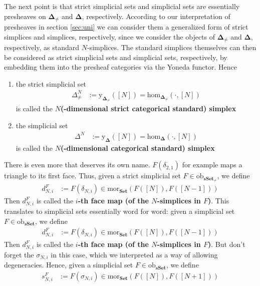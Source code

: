 The next point is that strict simplicial sets and simplicial sets are essentially presheaves on $\mathbf{\Delta}_{\neq}$ and $\mathbf{\Delta}$, respectively.
According to our interpretation of presheaves in section \ref{sec:uni} we can consider them a generalized form of strict simplices and simplices, respectively, since we consider the objects of $\mathbf{\Delta}_{\neq}$ and $\mathbf{\Delta}$, respectively, as standard $N$-simplices.
The standard simplices themselves can then be considered as strict simplicial sets and simplicial sets, respectively, by embedding them into the presheaf categories via the Yoneda functor.
Hence
\begin{enumerate}
\item[(1)]
the strict simplicial set
\begin{align*}
  \Delta_{\neq}^{N}
  &:=
  \mathrm{y}_{\mathbf{\Delta}_{\neq}}([N])
  =
  \mathrm{hom}_{\mathbf{\Delta}_{\neq}}(\cdot,[N])
\end{align*}
is called the \textbf{$N$(-dimensional strict categorical standard) simplex}
\item[(2)]
the simplicial set
\begin{align*}
  \Delta^{N}
  &:=
  \mathrm{y}_{\mathbf{\Delta}}([N])
  =
  \mathrm{hom}_{\mathbf{\Delta}}(\cdot,[N])
\end{align*}
is called the \textbf{$N$(-dimensional categorical standard) simplex}
\end{enumerate}
There is even more that deserves its own name.
$F(\delta_{2,1})$ for example maps a triangle to its first face.
Thus, given a strict simplicial set $F \in \mathrm{ob}_{\mathbf{sSet}_{\neq}}$, we define
\begin{align*}
  d_{N,i}^{F}
  &:=
  F(\delta_{N,i})
  \in
  \mathrm{mor}_{\mathbf{Set}}(F([N]),F([N-1]))
\end{align*}  
Then $d_{N,i}^{F}$ is called the \textbf{$i$-th face map (of the $N$-simplices in $F$)}.
This translates to simplicial sets essentially word for word: given a simplicial set $F \in \mathrm{ob}_{\mathbf{sSet}}$, we define
\begin{align*}
  d_{N,i}^{F}
  &:=
  F(\delta_{N,i})
  \in
  \mathrm{mor}_{\mathbf{Set}}(F([N]),F([N-1]))
\end{align*}  
Then $d_{N,i}^{F}$ is called the \textbf{$i$-th face map (of the $N$-simplices in $F$)}.
But don't forget the $\sigma_{N,i}$ in this case, which we interpreted as a way of allowing degeneracies.
Hence, given a simplicial set $F \in \mathrm{ob}_{\mathbf{sSet}}$, we define
\begin{align*}
  s_{N,i}^{F}
  &:=
  F(\sigma_{N,i})
  \in
  \mathrm{mor}_{\mathbf{Set}}(F([N]),F([N+1]))
\end{align*}
